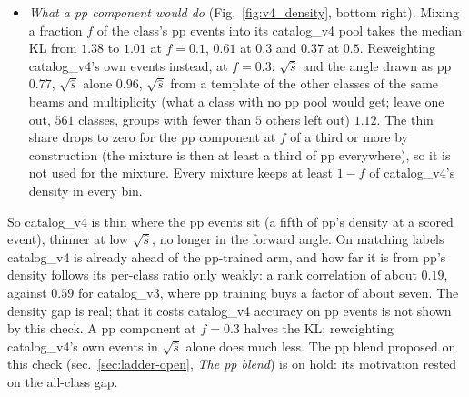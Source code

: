 \documentclass[11pt]{article}
\begin{document}
\begin{itemize}
    (median KL $1.31$, catalog\_v4 over pp-trained $0.66$): the KL's rank correlation with the log ratio is $0.19$
    ($95\%$ interval $0.10$ to $0.29$; $0.19$ to $0.21$ over the joint binnings, $-0.13$ to $0.27$ over all); the
    thin share's $0.28$ ($0.06$ to $0.38$ over the joint binnings). Per variable, $\sqrt{\hat s}$ now follows ($0.27$)
    and the forward angle goes the other way ($-0.12$).
  \item \emph{What a pp component would do} (Fig.~\ref{fig:v4_density}, bottom right). Mixing a fraction $f$ of the
    class's pp events into its catalog\_v4 pool takes the median KL from $1.38$ to $1.01$ at $f=0.1$, $0.61$ at $0.3$ and
    $0.37$ at $0.5$. Reweighting catalog\_v4's own events instead, at $f=0.3$: $\sqrt{\hat s}$ and the angle drawn as pp
    $0.77$, $\sqrt{\hat s}$ alone $0.96$, $\sqrt{\hat s}$ from a template of the other classes of the same beams and
    multiplicity (what a class with no pp pool would get; leave one out, $561$ classes, groups with fewer than $5$
    others left out) $1.12$. The thin share drops to zero for the pp component at $f$ of a third or more by construction (the
    mixture is then at least a third of pp everywhere), so it is not used for the mixture. Every mixture keeps at least
    $1-f$ of catalog\_v4's density in every bin.
\end{itemize}
So catalog\_v4 is thin where the pp events sit (a fifth of pp's density at a scored event), thinner at low $\sqrt{\hat
s}$, no longer in the forward angle. On matching labels catalog\_v4 is already ahead of the pp-trained arm, and how far
it is from pp's density follows its per-class ratio only weakly: a rank correlation of about $0.19$, against $0.59$
for catalog\_v3, where pp training buys a factor of about seven. The density gap is real; that it costs catalog\_v4
accuracy on pp events is not shown by this check. A
pp component at $f=0.3$ halves the KL; reweighting catalog\_v4's own events in $\sqrt{\hat s}$ alone does much less. The pp
blend proposed on this check (sec.~\ref{sec:ladder-open}, \emph{The pp blend}) is on hold: its motivation rested on
the all-class gap.
\end{document}

